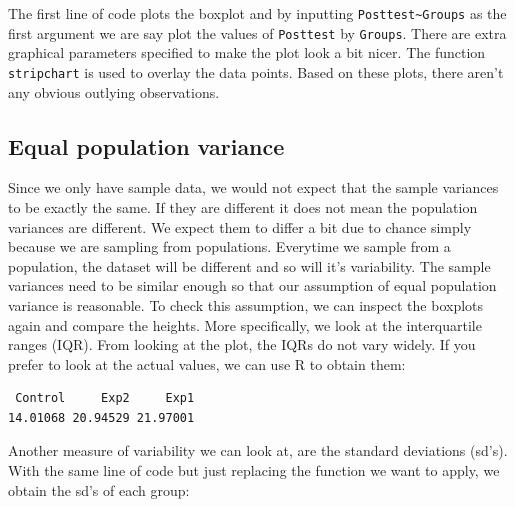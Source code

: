 \documentclass[
  letterpaper,
  DIV=11,
  numbers=noendperiod,
  oneside]{scrreprt}
\newenvironment{Shaded}{\begin{snugshade}}{\end{snugshade}}
\newcommand{\FunctionTok}[1]{\textcolor[rgb]{0.28,0.35,0.67}{#1}}
\newcommand{\NormalTok}[1]{\textcolor[rgb]{0.00,0.23,0.31}{#1}}
\newcommand{\SpecialCharTok}[1]{\textcolor[rgb]{0.37,0.37,0.37}{#1}}
\begin{document}
The first line of code plots the boxplot and by inputting
\texttt{Posttest\textasciitilde{}Groups} as the first argument we are
say plot the values of \texttt{Posttest} by \texttt{Groups}. There are
extra graphical parameters specified to make the plot look a bit nicer.
The function \texttt{stripchart} is used to overlay the data points.
Based on these plots, there aren't any obvious outlying observations.

\subsection*{Equal population variance}\label{equal-population-variance}

Since we only have sample data, we would not expect that the sample
variances to be exactly the same. If they are different it does not mean
the population variances are different. We expect them to differ a bit
due to chance simply because we are sampling from populations. Everytime
we sample from a population, the dataset will be different and so will
it's variability. The sample variances need to be similar enough so that
our assumption of equal population variance is reasonable. To check this
assumption, we can inspect the boxplots again and compare the heights.
More specifically, we look at the interquartile ranges (IQR). From
looking at the plot, the IQRs do not vary widely. If you prefer to look
at the actual values, we can use R to obtain them:

\begin{Shaded}
\end{Shaded}

\begin{verbatim}
 Control     Exp2     Exp1 
14.01068 20.94529 21.97001 
\end{verbatim}

Another measure of variability we can look at, are the standard
deviations (sd's). With the same line of code but just replacing the
function we want to apply, we obtain the sd's of each group:

\begin{Shaded}
\end{Shaded}
\end{document}
